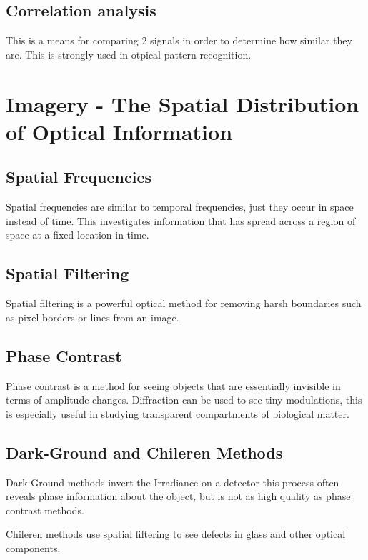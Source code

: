 \documentclass[12pt]{report}
\begin{document}
\subsection{Correlation analysis}
This is a means for comparing 2 signals in order to determine how similar they are. This is strongly used in otpical pattern recognition. 

\section{Imagery - The Spatial Distribution of Optical Information}
\subsection{Spatial Frequencies}
Spatial frequencies are similar to temporal frequencies, just they occur in space instead of time. This investigates information that has spread across a region of space at a fixed location in time. 
\subsection{Spatial Filtering}
Spatial filtering is a powerful optical method for removing harsh boundaries such as pixel borders or lines from an image. 
\subsection{Phase Contrast}
Phase contrast is a method for seeing objects that are essentially invisible in terms of amplitude changes. Diffraction can be used to see tiny modulations, this is especially useful in studying transparent compartments of biological matter. 
\subsection{Dark-Ground and Chileren Methods}
Dark-Ground methods invert the Irradiance on a detector this process often reveals phase information about the object, but is not as high quality as phase contrast methods. 

Chileren methods use spatial filtering to see defects in glass and other optical components. 
\end{document}

